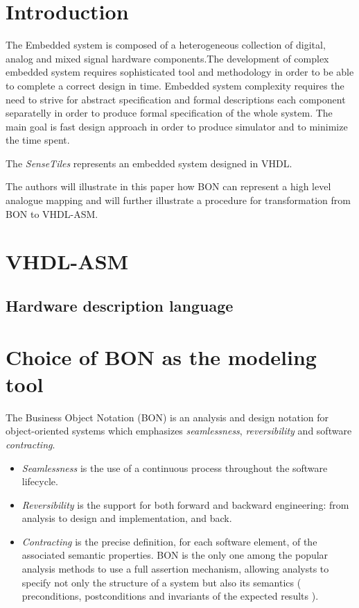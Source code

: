 \documentclass{article}
\newcommand{\todo}{\textbf{TODO:}}
\newcommand{\STs}{\emph{SenseTiles}\xspace}
\begin{document}
\section{Introduction}
The Embedded system is composed of a heterogeneous collection of digital,
analog and mixed signal hardware components.The development of complex 
embedded system requires sophisticated tool and methodology in order to 
be able to complete a correct design in time. Embedded system complexity 
requires the need to strive for abstract specification and formal 
descriptions each component separatelly in order to produce formal 
specification of the whole system. The main goal is fast design approach 
in order to produce simulator and to minimize the time spent.  

The \STs represents an embedded system designed in VHDL.


The authors will illustrate in this paper how BON can represent a high 
level analogue mapping and will further illustrate a procedure for 
transformation from BON to VHDL-ASM.


\section{VHDL-ASM}
\subsection{Hardware description language}

\section{Choice of BON as the modeling tool}
The Business Object Notation (BON) is an analysis and design notation for 
object-oriented systems  which emphasizes \emph{seamlessness}, \emph{reversibility} and software \emph{contracting}.

\begin{itemize}
\item \emph{Seamlessness} is the use of a continuous process throughout the software lifecycle.
\item \emph{Reversibility} is the support for both forward and backward engineering: from analysis to
design and implementation, and back.
\item \emph{Contracting} is the precise definition, for each software element, of the associated semantic properties. 
BON is the only one among the popular analysis methods to use a full assertion
mechanism, allowing analysts to specify not only the structure of a system but also its
semantics ( preconditions, postconditions and invariants of the expected results ).
\end{itemize}
\end{document}
